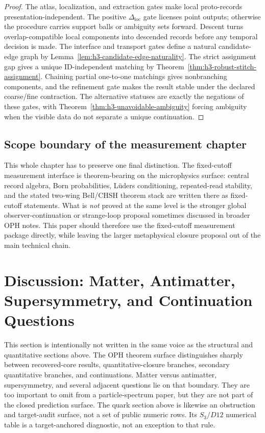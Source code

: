 \documentclass[11pt]{article}
\begin{document}
\begin{proof}
The atlas, localization, and extraction gates make local proto-records presentation-independent.
The positive \(\Delta_{\mathrm{loc}}\) gate licenses point outputs; otherwise the procedure carries
support balls or ambiguity sets forward. Descent turns overlap-compatible local components into
descended records before any temporal decision is made.
The interface and transport gates define a natural candidate-edge graph by
Lemma~\ref{lem:h3-candidate-edge-naturality}. The strict assignment gap gives a unique
ID-independent matching by Theorem~\ref{thm:h3-robust-stitch-assignment}. Chaining partial
one-to-one matchings gives nonbranching components, and the refinement gate makes the result
stable under the declared coarse/fine contraction. The alternative statuses are exactly the
negations of these gates, with Theorem~\ref{thm:h3-unavoidable-ambiguity} forcing ambiguity when
the visible data do not separate a unique continuation.
\end{proof}

\subsection{Scope boundary of the measurement chapter}

This whole chapter has to preserve one final distinction. The fixed-cutoff measurement interface
is theorem-bearing on the microphysics surface: central record algebra, Born
probabilities, L\"uders conditioning, repeated-read stability, and the stated two-wing
Bell/CHSH theorem stack are written there as fixed-cutoff statements. What is \emph{not} proved
at the same level is the stronger global observer-continuation or strange-loop proposal sometimes
discussed in broader OPH notes. This paper should therefore use the fixed-cutoff measurement
package directly, while leaving the larger metaphysical closure proposal out of the main technical
chain.

\section{Discussion: Matter, Antimatter, Supersymmetry, and Continuation Questions}

This section is intentionally not written in the same voice as the structural and quantitative
sections above. The OPH theorem surface distinguishes sharply between recovered-core
results, quantitative-closure branches, secondary quantitative branches, and continuations. Matter versus
antimatter, supersymmetry, and several adjacent questions lie on that boundary. They are too
important to omit from a particle-spectrum paper, but they are not part of the closed
prediction surface. The quark section above is likewise an obstruction and target-audit surface,
not a set of public numeric rows. Its \(S_3/D12\) numerical table is a target-anchored
diagnostic, not an exception to that rule.
\end{document}
